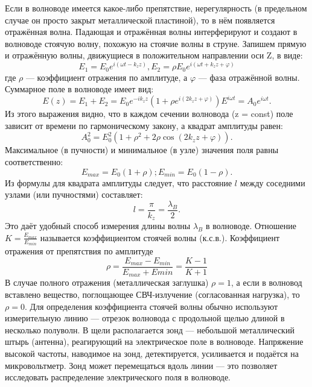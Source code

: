 \documentclass[a4paper,12pt]{article}
\begin{document}
Если в волноводе имеется какое-либо препятствие, нерегулярность (в предельном случае он просто закрыт металлической пластиной), то в нём появляется отражённая волна. Падающая и отражённая волны интерферируют и создают в волноводе стоячую волну, похожую на стоячие волны в струне. Запишем прямую и отражённую волны, движущиеся в положительном направлении оси Z, в виде:
\begin{equation}
    E_1 = E_0 e^{i (\omega t - k_z z)}, E_2 = \rho E_0 e^{i(\omega t + k_z z + \varphi)}
\end{equation}
где $\rho$ — коэффициент отражения по амплитуде, а $\varphi$ — фаза отражённой волны. Суммарное поле в волноводе имеет вид:
\begin{equation}
    E(z) = E_1 + E_2 = E_0 e^{-i k_z z} (1 + \rho e^{i (2 k_z z + \varphi)}) E^{i \omega t} = A_0 e^{i \omega t}.
\end{equation}
Из этого выражения видно, что в каждом сечении волновода (z = const) поле зависит от времени по гармоническому закону, а квадрат амплитуды равен:
\begin{equation}
    A_0^2 = E_0^2 (1 + \rho^2 + 2 \rho \cos (2 k_z z + \varphi)).
\end{equation}
Максимальное (в пучности) и минимальное (в узле) значения поля равны соответственно:
\begin{equation}
    E_{max} = E_0 (1 + \rho); E_{min} = E_0 (1 - \rho).
\end{equation}
Из формулы для квадрата амплитуды следует, что расстояние $l$ между соседними узлами (или пучностями) составляет:
\begin{equation}
    l = \frac{\pi}{k_z} = \frac{\lambda_B}{2}.
\end{equation}
Это даёт удобный способ измерения длины волны $\lambda_B$ в волноводе.
Отношение $K = \frac{E_{max}}{E_{min}}$ называется коэффициентом стоячей волны (к.с.в.). Коэффициент отражения от препятствия по амплитуде
\begin{equation}
    \rho = \frac{E_{max} - E_{min}}{E_{max} + E{min}} = \frac{K - 1}{K + 1}
\end{equation}
В случае полного отражения (металлическая заглушка) $\rho = 1$, а если в волновод вставлено вещество, поглощающее СВЧ-излучение (согласованная нагрузка), то $\rho = 0$. Для определения коэффициента стоячей волны обычно используют измерительную линию — отрезок волновода с продольной щелью длиной в несколько полуволн. В щели располагается зонд — небольшой металлический штырь (антенна), реагирующий на электрическое поле в волноводе. Напряжение высокой частоты, наводимое на зонд, детектируется, усиливается и подаётся на микровольтметр. Зонд может перемещаться вдоль линии — это позволяет исследовать распределение электрического поля в волноводе.
\end{document}
